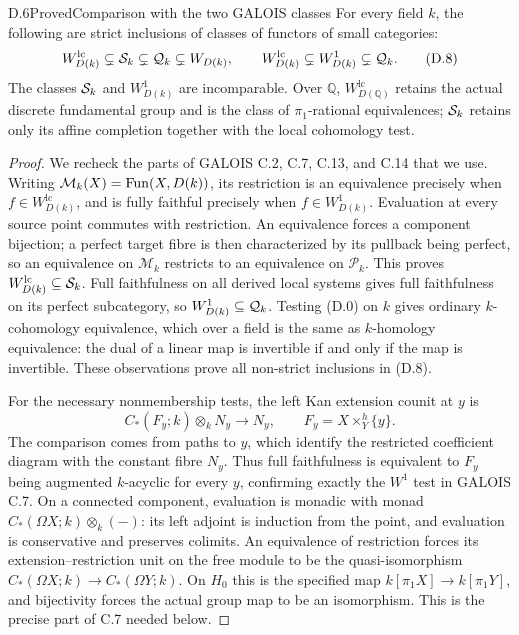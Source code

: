 \begin{claim}{D.6}{Proved}{Comparison with the two GALOIS classes}
\label{D6}
For every field $k$, the following are strict inclusions of classes of
functors of small categories:
\[
 W^{\mathrm{lc}}_{D(k)}\subsetneq\mathcal S_k\subsetneq\mathcal Q_k\subsetneq W_{D(k)},
 \qquad
 W^{\mathrm{lc}}_{D(k)}\subsetneq W^1_{D(k)}\subsetneq\mathcal Q_k.
 \tag{D.8}
\]
The classes $\mathcal S_k$ and $W^1_{D(k)}$ are incomparable. Over $\mathbb Q$,
$W^{\mathrm{lc}}_{D(\mathbb Q)}$ retains the actual discrete fundamental
group and is the class of $\pi_1$-rational equivalences; $\mathcal S_k$ retains
only its affine completion together with the local cohomology test.
\end{claim}
\begin{proof}
We recheck the parts of GALOIS C.2, C.7, C.13, and C.14 that we use.
Writing $\mathcal M_k(X)=\operatorname{Fun}(X,D(k))$, its restriction is an
equivalence precisely when $f\in W^{\mathrm{lc}}_{D(k)}$, and is
fully faithful precisely when $f\in W^1_{D(k)}$. Evaluation at every
source point commutes with restriction. An equivalence forces a
component bijection; a perfect target fibre is then characterized by
its pullback being perfect, so an equivalence on $\mathcal M_k$
restricts to an equivalence on $\mathcal P_k$. This proves
$W^{\mathrm{lc}}_{D(k)}\subseteq\mathcal S_k$.
Full faithfulness on all derived local systems gives full faithfulness
on its perfect subcategory, so $W^1_{D(k)}\subseteq\mathcal Q_k$.
Testing (D.0) on $k$ gives ordinary $k$-cohomology equivalence, which
over a field is the same as $k$-homology equivalence: the dual of a
linear map is invertible if and only if the map is invertible.
These observations prove all non-strict inclusions in (D.8).

For the necessary nonmembership tests, the left Kan extension counit
at $y$ is
\[
 C_*(F_y;k)\otimes_k N_y\longrightarrow N_y,
 \qquad F_y=X\times_Y^h\{y\}.
 \tag{D.9}
\]
The comparison comes from paths to $y$, which identify the restricted
coefficient diagram with the constant fibre $N_y$. Thus full
faithfulness is equivalent to $F_y$ being augmented $k$-acyclic for
every $y$, confirming exactly the $W^1$ test in GALOIS C.7.
On a connected component, evaluation is monadic with monad
$C_*(\Omega X;k)\otimes_k(-)$: its left adjoint is induction from
the point, and evaluation is conservative and preserves colimits.
An equivalence of restriction forces its extension--restriction unit
on the free module to be the quasi-isomorphism
$C_*(\Omega X;k)\to C_*(\Omega Y;k)$.
On $H_0$ this is the specified map
$k[\pi_1X]\to k[\pi_1Y]$, and bijectivity forces the actual group map
to be an isomorphism. This is the precise part of C.7 needed below.


\end{proof}
